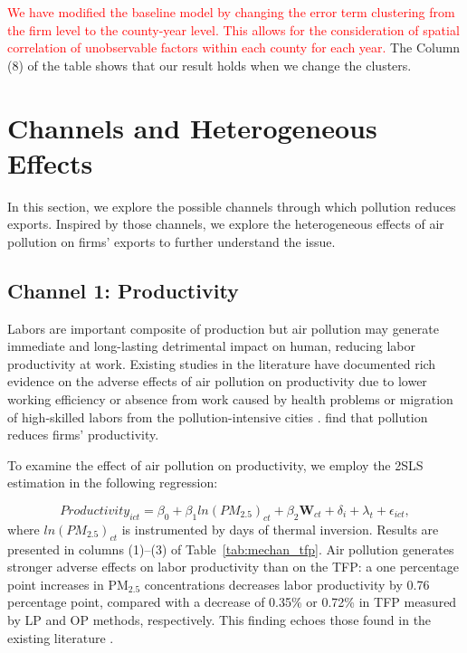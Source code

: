 \documentclass[12pt]{article}
\begin{document}
\textcolor{red}{We have modified the baseline model by changing the error term clustering from the firm level to the county-year level. This allows for the consideration of spatial correlation of unobservable factors within each county for each year.} The Column (8) of the
table shows that our result holds when we change the clusters.

\section{Channels and Heterogeneous Effects}
\label{sec:5} %

In this section, we explore the possible channels through which pollution
reduces exports. Inspired by those channels, we explore the heterogeneous
effects of air pollution on firms' exports to further understand the issue. 

\subsection{Channel 1: Productivity}
\label{sec:5.1} 
Labors are important composite of production but air
pollution may generate immediate and long-lasting detrimental impact on
human, reducing labor productivity at work. Existing studies in the
literature have documented rich evidence on the adverse effects of air
pollution on productivity due to lower working efficiency or absence from
work caused by health problems %
\citep{chang2016particulate,fu2021air,somanathan2021impact} or migration of
high-skilled labors from the pollution-intensive cities %
\citep{chen2022effect,NBERw28401}. %
\citep{fu2021air,somanathan2021impact,chang2016particulate,adhvaryu2022management}
find that pollution reduces firms' productivity.

To examine the effect of air pollution on productivity, we
employ the 2SLS estimation in the following regression:

\begin{equation*}
Productivity_{ict}=\beta _{0}+\beta _{1}ln(PM_{2.5})_{ct}+\beta _{2}\mathbf{W}%
_{ct}+\delta _{i}+\lambda _{t}+\epsilon _{ict},
\end{equation*}%
where $ln(PM_{2.5})_{ct}$ is instrumented by days of thermal inversion. Results
are presented in columns (1)--(3) of Table~\ref{tab:mechan_tfp}. Air
pollution generates stronger adverse effects on labor productivity than on
the TFP: a one percentage point increases in $\mathrm{PM_{2.5}}$
concentrations decreases labor productivity by 0.76 percentage point,
compared with a decrease of 0.35\% or 0.72\% in TFP measured by LP and OP
methods, respectively. This finding echoes those found in the existing
literature %
\citep{fu2021air,somanathan2021impact,chang2016particulate,adhvaryu2022management}%
.
\end{document}
